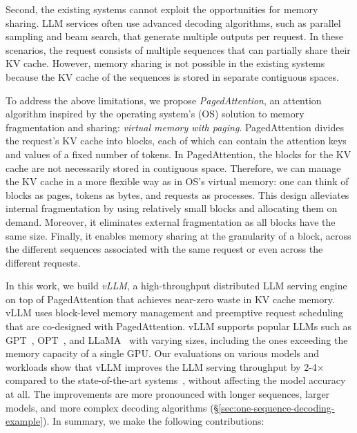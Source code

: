 Second, the existing systems cannot exploit the opportunities for memory sharing. LLM services often use advanced decoding algorithms, such as parallel sampling and beam search, that generate multiple outputs per request. In these scenarios, the request consists of multiple sequences that can partially share their KV cache. However, memory sharing is not possible in the existing systems because the KV cache of the sequences is stored in separate contiguous spaces.

To address the above limitations, we propose \emph{PagedAttention}, an attention algorithm inspired by the operating system's (OS) solution to memory fragmentation and sharing: \emph{virtual memory with paging}. PagedAttention divides the request's KV cache into blocks, each of which can contain the attention keys and values of a fixed number of tokens. In PagedAttention, the blocks for the KV cache are not necessarily stored in contiguous space. Therefore, we can manage the KV cache in a more flexible way as in OS’s virtual memory: one can think of blocks as pages, tokens as bytes, and requests as processes. This design alleviates internal fragmentation by using relatively small blocks and allocating them on demand. Moreover, it eliminates external fragmentation as all blocks have the same size. Finally, it enables memory sharing at the granularity of a block, across the different sequences associated with the same request or even across the different requests.

In this work, we build \emph{vLLM}, a high-throughput distributed LLM serving engine on top of PagedAttention that achieves near-zero waste in KV cache memory. vLLM uses block-level memory management and preemptive request scheduling that are co-designed with PagedAttention. vLLM supports popular LLMs such as GPT~\cite{brown2020language}, OPT~\cite{zhang2022opt}, and LLaMA~\cite{touvron2023llama} with varying sizes, including the ones exceeding the memory capacity of a single GPU. Our evaluations on various models and workloads show that vLLM improves the LLM serving throughput by 2-4$\times$ compared to the state-of-the-art systems~\cite{yu2022orca,nvidiaft}, without affecting the model accuracy at all. The improvements are more pronounced with longer sequences, larger models, and more complex decoding algorithms (\S\ref{sec:one-sequence-decoding-example}).
In summary, we make the following contributions:

